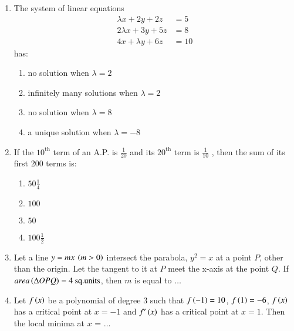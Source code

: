 \documentclass[journal]{IEEEtran}
\begin{document}
\begin{enumerate}
    
    \item The system of linear equations
    \begin{align*}
        \lambda x + 2y + 2z &= 5 \\
        2\lambda x + 3y + 5z &= 8 \\
        4x + \lambda y + 6z &= 10     
    \end{align*}
    has:
    
    \begin{multicols}{2}
        \begin{enumerate}
            \item no solution when $\lambda = 2$
            \item infinitely many solutions when $\lambda = 2$
            \columnbreak
            \item no solution when $\lambda = 8$
            \item a unique solution when $\lambda = -8$
        \end{enumerate}
    \end{multicols}
    
    \item If the $10^\text{th}$ term of an A.P. is $\frac{1}{20}$ and its $20^\text{th}$ term is $\frac{1}{10}$ , then the sum of its first 200 terms is:
    \begin{multicols}{2}
        \begin{enumerate}
            \item $50 \frac{1}{4}$
            \item $100$
            \columnbreak
            \item $50$
            \item $100 \frac{1}{2}$
        \end{enumerate}
    \end{multicols}
    
    \item Let a line $y = mx \: \left(m > 0\right)$ intersect the parabola, $y^2 = x$ at a point $P$, other than the origin. Let the tangent to it at $P$ meet the x-axis at the point $Q$. If $area\left(\Delta OPQ\right) = 4 \text{ sq.units}$, then $m$ is equal to $\ldots$\\
    
    \item Let $f\left(x\right)$ be a polynomial of degree 3 such that $f\left(-1\right) = 10$, $f\left(1\right) = -6$, $f\left(x\right)$ has a critical point at $x = -1$ and $f^\prime\left(x\right)$ has a critical point at $x = 1$. Then the local minima at $x$ = $\ldots$\\
    

\end{enumerate}
\end{document}
